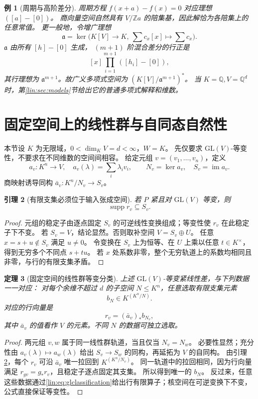 \documentclass[11pt,a4paper,oneside,openany]{book}
\theoremstyle{lecture}
\newtheorem{theorem}{定理}[section]
\newtheorem{lemma}[theorem]{引理}
\newtheorem{example}[theorem]{例}
\newcommand{\Q}{\mathbb Q}
\newcommand{\Z}{\mathbb Z}
\newcommand{\im}{\operatorname{im}}
\newcommand{\supp}{\operatorname{supp}}
\numberwithin{equation}{section}
\begin{document}
\begin{example}[周期与高阶差分]
周期方程 $f(x+a)-f(x)=0$ 对应理想 $([a]-[0])$。
商向量空间自然具有 $V/\Z a$ 的陪集基，因此解恰为各陪集上的任意常值。
更一般地，令增广理想
\[
 \mathfrak a=\ker\bigl(K[V]\to K,\ \sum c_x[x]\mapsto\sum c_x\bigr).
\]
$\mathfrak a$ 由所有 $[h]-[0]$ 生成，
$(m+1)$ 阶混合差分的行正是
\[
 [x]\prod_{i=1}^{m+1}([h_i]-[0]),
\]
其行理想为 $\mathfrak a^{m+1}$。故广义多项式空间为 $(K[V]/\mathfrak a^{m+1})^*$。
当 $K=\Q,V=\Q^d$ 时，第\ref{lin:sec:models}节给出它的普通多项式解释和维数。
\end{example}

\section{固定空间上的线性群与自同态自然性}\label{lin:sec:fixednatural}
本节设 $K$ 为无限域，$0<\dim_KV=d<\infty$，$W=K$。
先仅要求 $\mathrm{GL}(V)$-等变性，不要求在不同维数的空间间相容。
给定元组 $v=(v_1,\ldots,v_n)$，定义
\[
 a_v:K^n\to V,\quad a_v(\lambda)=\sum_i\lambda_iv_i,
 \qquad N_v=\ker a_v,\quad S_v=\im a_v.
\]
商映射诱导同构 $\bar a_v:K^n/N_v\to S_v$。

\begin{lemma}[有限支集必须位于输入张成空间]\label{lin:lem:supportspan}
若 $P$ 紧且对 $\mathrm{GL}(V)$ 等变，则
\[
 \supp r_v\subseteq S_v.
\]
\end{lemma}
\begin{proof}
元组的稳定子由逐点固定 $S_v$ 的可逆线性变换组成；等变性使 $r_v$ 在此稳定子下不变。
若 $S_v=V$，结论显然。否则取补空间 $V=S_v\oplus U$。
任意 $x=s+u\notin S_v$ 满足 $u\ne0$。
令变换在 $S_v$ 上为恒等、在 $U$ 上乘以任意 $t\in K^\times$，得到无穷多个不同点 $s+tu$。
若 $x$ 处系数非零，整个无穷轨道上的系数均相同且非零，与行的有限支集矛盾。
\end{proof}

\begin{theorem}[固定空间的线性群等变分类]\label{lin:thm:glclassification}
上述 $\mathrm{GL}(V)$-等变紧线性差，与下列数据一一对应：
对每个余维不超过 $d$ 的子空间 $N\le K^n$，任意选取有限支集元素
\[
 b_N\in K^{(K^n/N)}.
\]
对应的行向量是
\begin{equation}\label{lin:eq:glclassification}
 r_v=(\bar a_v)_*b_{N_v},
\end{equation}
其中 $\bar a_v$ 的值看作 $V$ 的元素。不同 $N$ 的数据可独立选取。
\end{theorem}
\begin{proof}
两元组 $v,w$ 属于同一线性群轨道，当且仅当 $N_v=N_w$。
必要性显然；充分性由 $a_v(\lambda)\mapsto a_w(\lambda)$ 给出 $S_v\to S_w$ 的同构，再延拓为 $V$ 的自同构。
由引理\ref{lin:lem:supportspan}，每个 $r_v$ 可沿 $\bar a_v$ 唯一拉回到 $K^{(K^n/N_v)}$。
同一轨道中的拉回相同，因为行向量满足 $r_{gv}=g_*r_v$，且稳定子逐点固定其支集。
所以得到唯一的 $b_N$。
反过来，任意这些数据通过\eqref{lin:eq:glclassification}给出行有限算子；核空间在可逆变换下不变，公式直接保证等变性。
\end{proof}
\end{document}
